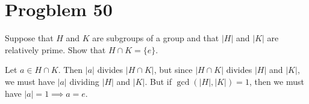 \documentclass[12pt]{article}
\begin{document}
%
%

\section*{Progblem 50}

Suppose that $H$ and $K$ are subgroups of a group and that $|H|$ and
$|K|$ are relatively prime.  Show that $H\cap K=\{e\}$.

Let $a\in H\cap K$.  Then $|a|$ divides $|H\cap K|$, but
since $|H\cap K|$ divides $|H|$ and $|K|$, we must have $|a|$
dividing $|H|$ and $|K|$.  But if $\gcd(|H|,|K|)=1$, then
we must have $|a|=1\implies a=e$.
\end{document}
